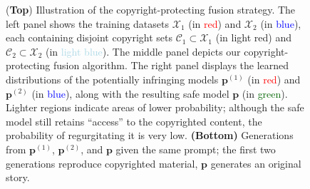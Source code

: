 \begin{figure}[t!]
\caption{ (\textbf{Top}) Illustration of the copyright-protecting fusion strategy. The left panel shows the training datasets \( \mathcal{X}_1 \) (in \textcolor{red}{red}) and \( \mathcal{X}_2 \) (in \textcolor{blue}{blue}), each containing disjoint copyright sets \( \mathcal{C}_1 \subset \mathcal{X}_1 \) (in \textcolor{lightred}{light red}) and \( \mathcal{C}_2 \subset \mathcal{X}_2 \) (in \textcolor{lightblue}{light blue}). The middle panel depicts our copyright-protecting fusion algorithm. The right panel displays the learned distributions of the potentially infringing models \( \mathbf{p}^{(1)} \) (in \textcolor{red}{red}) and \( \mathbf{p}^{(2)} \) (in \textcolor{blue}{blue}), along with the resulting safe model \( \mathbf{p} \) (in \textcolor{darkgreen}{green}). Lighter regions indicate areas of lower probability; although the safe model still retains “access” to the copyrighted content, the probability of regurgitating it is very low. \textbf{(Bottom)} Generations from \( \mathbf{p}^{(1)} \), \( \mathbf{p}^{(2)} \), and \( \mathbf{p} \) given the same prompt; the first two generations reproduce copyrighted material, \( \mathbf{p} \) generates an original story.}


\label{figure1}
\end{figure}

\nocite{abad2025copyright}




